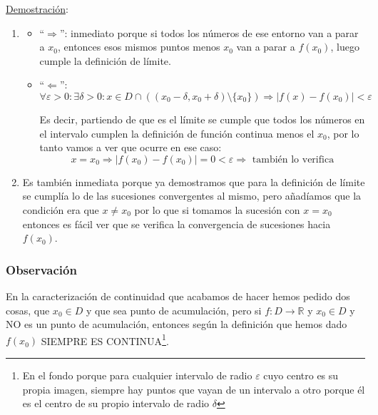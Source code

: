 \documentclass[10pt,a4paper,openright]{book}
\begin{document}
\underline{Demostración}:
\begin{enumerate}
\item 
\begin{itemize}
\item ``$\Rightarrow $'': inmediato porque si todos los números de ese entorno van a parar a $x_0$, entonces esos mismos puntos menos $x_0$ van a parar a $f(x_0)$, luego cumple la definición de límite.

\item ``$\Leftarrow$'':
$$\forall \varepsilon>0 : \exists \delta >0 : x\in D\cap\left( (x_0-\delta, x_0+\delta)\mbox{\textbackslash}\{x_0\}\right)\Rightarrow |f(x)-f(x_0)|<\varepsilon$$

Es decir, partiendo de que es el límite se cumple que todos los números en el intervalo cumplen la definición de función continua menos el $x_0$, por lo tanto vamos a ver que ocurre en ese caso:
$$x=x_0\Rightarrow |f(x_0)-f(x_0)|=0<\varepsilon\Rightarrow \mbox{ también lo verifica}$$
\end{itemize}

\item Es también inmediata porque ya demostramos que para la definición de límite se cumplía lo de las sucesiones convergentes al mismo, pero añadíamos que la condición era que $x\neq x_0$ por lo que si tomamos la sucesión con $x=x_0$ entonces es fácil ver que se verifica la convergencia de sucesiones hacia $f(x_0)$.
\end{enumerate}

\subsubsection*{Observación}
En la caracterización de continuidad que acabamos de hacer hemos pedido dos cosas, que $x_0\in D$ y que sea punto de acumulación, pero si $f: D \longrightarrow \mathbb R$ y $x_0\in D$ y NO es un punto de acumulación, entonces según la definición que hemos dado $f(x_0)$ SIEMPRE ES CONTINUA\footnote{En el fondo porque para cualquier intervalo de radio $\varepsilon$ cuyo centro es su propia imagen, siempre hay puntos que vayan de un intervalo a otro porque él es el centro de su propio intervalo de radio $\delta$}.
\end{document}
